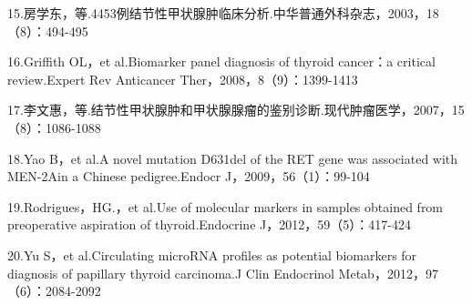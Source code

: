 15.房学东，等.4453例结节性甲状腺肿临床分析.中华普通外科杂志，2003，18（8）：494-495

16.Griffith OL，et al.Biomarker panel diagnosis of thyroid cancer：a
critical review.Expert Rev Anticancer Ther，2008，8（9）：1399-1413

17.李文惠，等.结节性甲状腺肿和甲状腺腺瘤的鉴别诊断.现代肿瘤医学，2007，15（8）：1086-1088

18.Yao B，et al.A novel mutation D631del of the RET gene was associated
with MEN-2Ain a Chinese pedigree.Endocr J，2009，56（1）：99-104

19.Rodrigues，HG.，et al.Use of molecular markers in samples obtained
from preoperative aspiration of thyroid.Endocrine
J，2012，59（5）：417-424

20.Yu S，et al.Circulating microRNA profiles as potential biomarkers for
diagnosis of papillary thyroid carcinoma.J Clin Endocrinol
Metab，2012，97（6）：2084-2092

\protect\hypertarget{text00306.html}{}{}

